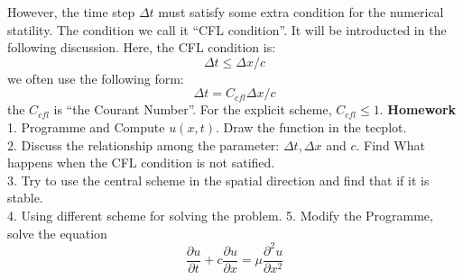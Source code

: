 \documentclass[a4paper]{article}
\begin{document}
However, the time step $\Delta t$ must satisfy some extra condition for the numerical statility. The condition we call it ``CFL condition''. It will be introducted in the following discussion. Here, the CFL condition is:
\begin{equation}
  \Delta t\le \Delta x/c
\end{equation}
we often use the following form:
\begin{equation}
  \Delta t=C_{cfl}\Delta x/c
\end{equation}
the $C_{cfl}$ is ``the Courant Number''. For the explicit scheme, $C_{cfl}\le 1$.
\newline
\textbf{Homework}\\
1. Programme and Compute $u(x,t)$. Draw the function in the tecplot.\\
2. Discuss the relationship among the parameter: $\Delta t, \Delta x$ and $c$. Find What happens when the CFL condition is not satified.\\
3. Try to use the central scheme in the spatial direction and find that if it is stable. \\
4. Using different scheme for solving the problem.
5. Modify the Programme, solve the equation \\
\begin{equation}
\frac {\partial u}{\partial t}+c\frac {\partial u}{\partial x}=\mu \frac {\partial^2 u}{\partial x^2}
\end{equation}
\end{document}
